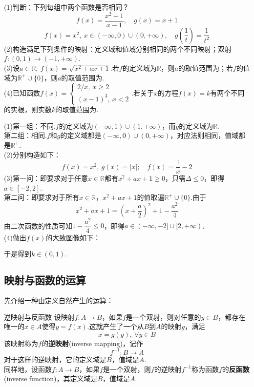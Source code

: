 \documentclass[lang=cn, zihao=5]{elegantbook}
\newcommand{\ssb}[1]{\left( #1 \right)}
\newcommand{\R}{\mathbb{R}}
\newcommand{\tk}{\uline{\hspace{4em}}}
\begin{document}
\begin{example}
	(1)判断：下列每组中两个函数是否相同？
	$$f(x)=\frac{x^2-1}{x-1},\quad g(x)=x+1$$
	$$f(x)=x^2,~x \in (-\infty ,0)\cup (0,+\infty),\quad g\ssb{\frac{1}{t}}=\frac{1}{t^2}$$
	(2)构造满足下列条件的映射：定义域和值域分别相同的两个不同映射；双射$f:(0,1) \to (-1,+\infty)$. \\
	(3)设$a \in \R ,~f(x)=\sqrt{x^2+ax+1}$.若$f$的定义域为$\R$，则$a$的取值范围为\tk ；若$f$的值域为$\R ^{+} \cup \{ 0 \}$，则$a$的取值范围为\tk . \\
	(4)已知函数$f(x)=\begin{cases}
		2/x,~x \geq 2 \\ (x-1)^3,~x<2
	\end{cases}$.若关于$x$的方程$f(x)=k$有两个不同的实根，则实数$k$的取值范围为\tk .
\end{example}
\begin{solution}
	(1)第一组：不同.$f$的定义域为$(-\infty ,1)\cup (1,+\infty)$，而$g$的定义域为$\R$. \\
	第二组：相同.$f$和$g$的定义域都是$(-\infty ,0)\cup (0,+\infty)$，对应法则相同，值域都是$\R ^{+}$. \\
	(2)分别构造如下：$$f(x)=x^2, ~g(x)=|x|;\quad f(x)=\frac{1}{x}-2$$
	(3)第一问：即要求对于任意$x \in \R$都有$x^2+ax+1 \geq 0$，只需$\Delta \leq 0$，即得$a \in [-2,2]$. \\
	第二问：即要求对于所有$x \in \R$，$x^2+ax+1$的值取遍$\R ^{+} \cup \{ 0 \}$.由于$$x^2+ax+1 = \ssb{x+\frac{a}{2}}^2 + 1-\frac{a^2}{4}$$
	由二次函数的性质可知$1-\dfrac{a^2}{4} \leq 0$，即得$a \in (-\infty ,-2]\cup [2,+\infty)$. \\
	(4)做出$f(x)$的大致图像如下：
	\begin{figure}[h!]
		\centering
		
	\end{figure}
	于是得到$k \in (0,1)$.
\end{solution}

\newpage
\subsection{映射与函数的运算}

先介绍一种由定义自然产生的运算：

\begin{definition}{逆映射与反函数} %
    设映射$f:A \to B$，如果$f$是一个双射，则对任意的$y \in B$，都存在唯一的$x \in A$使得$y=f(x)$.这就产生了一个从$B$到$A$的映射$g$，满足$$x=g(y),~\forall y \in B$$
    该映射称为$f$的\textbf{逆映射}(inverse mapping)，记作$$f^{-1}:B \to A$$
    对于这样的逆映射，它的定义域是$B$，值域是$A$.\\
    同样地，设函数$f:A \to B$，如果$f$是一个双射，则$f$的逆映射$f^{-1}$称为函数$f$的\textbf{反函数}(inverse function)，其定义域是$B$，值域是$A$.
\end{definition}
\end{document}
